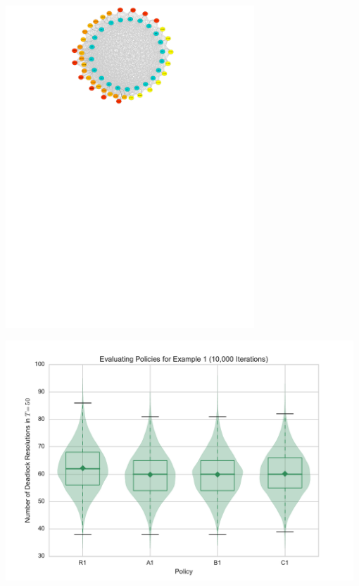 \documentclass[xcolor={table}]{beamer}
\begin{document}
\begin{frame}
\begin{center}
\includegraphics[width=0.7\textwidth]{../images/example1_mdp.pdf}
\end{center}
\end{frame}

\begin{frame}
\begin{center}
\includegraphics[width=0.98\textwidth]{../images/evaluation_example1.pdf}
\end{center}
\end{frame}
\end{document}
